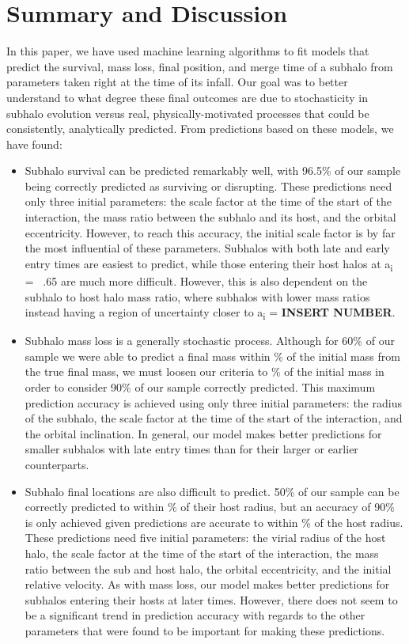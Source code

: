 \documentclass[fleqn,usenatbib]{mnras}
\newcommand\edits[1]{{\color{red}#1}}
\begin{document}
\section{Summary and Discussion}
\label{sec:Conclusion}
In this paper, we have used machine learning algorithms to fit models that predict the survival, mass loss, final position, and merge time of a subhalo from parameters taken right at the time of its infall. Our goal was to better understand to what degree these final outcomes are due to stochasticity in subhalo evolution versus real, physically-motivated processes that could be consistently, analytically predicted. From predictions based on these models, we have found:
\begin{itemize}
    \item Subhalo survival can be predicted remarkably well, with 96.5\% of our sample being correctly predicted as surviving or disrupting. These predictions need only three initial parameters: the scale factor at the time of the start of the interaction, the mass ratio between the subhalo and its host, and the orbital eccentricity. However, to reach this accuracy, the initial scale factor is by far the most influential of these parameters. Subhalos with both late and early entry times are easiest to predict, while those entering their host halos at a\textsubscript{i} = ~.65 are much more difficult. However, this is also dependent on the subhalo to host halo mass ratio, where subhalos with lower mass ratios instead having a region of uncertainty closer to  a\textsubscript{i} = \edits{\textbf{INSERT NUMBER}}.
    \item Subhalo mass loss is a generally stochastic process. Although for 60\% of our sample we were able to predict a final mass within \% of the initial mass from the true final mass, we must loosen our criteria to \% of the initial mass in order to consider 90\% of our sample correctly predicted. This maximum prediction accuracy is achieved using only three initial parameters: the radius of the subhalo, the scale factor at the time of the start of the interaction, and the orbital inclination. In general, our model makes better predictions for smaller subhalos with late entry times than for their larger or earlier counterparts.
    \item Subhalo final locations are also difficult to predict. 50\% of our sample can be correctly predicted to within \% of their host radius, but an accuracy of 90\% is only achieved given predictions are accurate to within \% of the host radius. These predictions need five initial parameters: the virial radius of the host halo, the scale factor at the time of the start of the interaction, the mass ratio between the sub and host halo, the orbital eccentricity, and the initial relative velocity. As with mass loss, our model makes better predictions for subhalos entering their hosts at later times. However, there does not seem to be a significant trend in prediction accuracy with regards to the other parameters that were found to be important for making these predictions. 

\end{itemize}
\end{document}
